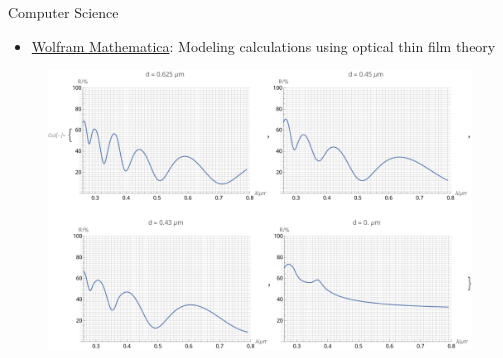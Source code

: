 \documentclass[9pt,aspectratio=169,hyperref=colorlinks]{beamer}
\begin{document}
\begin{frame}{Computer Science}
    \begin{itemize}
        \item \href{https://www.wolfram.com/mathematica/}{Wolfram Mathematica}: Modeling calculations using optical thin film theory
    \end{itemize}

    \begin{figure}
        \centering
        \includegraphics[scale=0.39]{CV/figs/3.2.pdf}
    \end{figure}
\end{frame}
\end{document}

